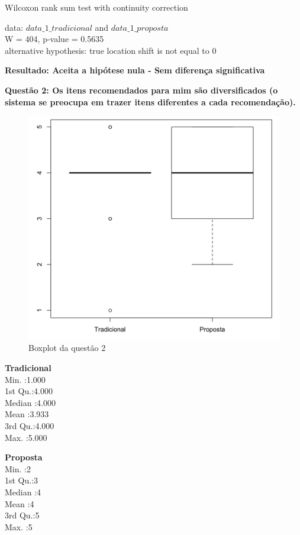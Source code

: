 Wilcoxon rank sum test with continuity correction

\noindent
data:  $data\_1\_tradicional$ and $data\_1\_proposta$\\
W = 404, p-value = 0.5635\\
alternative hypothesis: true location shift is not equal to 0

\textbf{Resultado: Aceita a hipótese nula - Sem diferença significativa}

\newpage
\textbf{Questão 2: Os itens recomendados para mim são diversificados (o sistema se preocupa em trazer itens diferentes a cada recomendação).}

\begin{figure}[htb]
  \caption{\label{fig:questao2-boxplot}Boxplot da questão 2}
  \begin{center}
      \includegraphics[scale=0.4]{./Figuras/questao2-boxplot.png}
  \end{center}
\end{figure}

\begin{multicols}{2}

\noindent\textbf{Tradicional}\\
Min.   :1.000\\
1st Qu.:4.000\\
Median :4.000\\
Mean   :3.933\\
3rd Qu.:4.000\\
Max.   :5.000\\
\columnbreak

\noindent\textbf{Proposta}\\
Min.   :2\\
1st Qu.:3\\
Median :4\\
Mean   :4\\
3rd Qu.:5\\
Max.   :5
\end{multicols}

